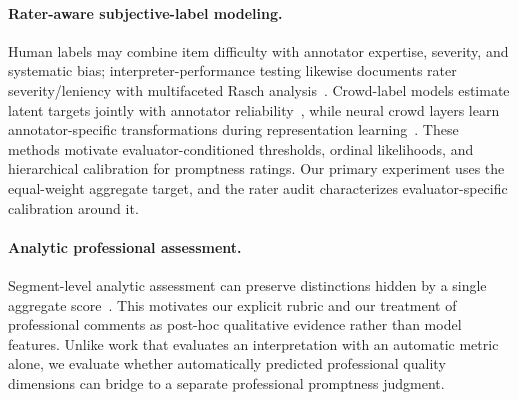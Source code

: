 \paragraph{Rater-aware subjective-label modeling.}
Human labels may combine item difficulty with annotator expertise, severity, and systematic bias; interpreter-performance testing likewise documents rater severity/leniency with multifaceted Rasch analysis~\citep{han2015rater}. Crowd-label models estimate latent targets jointly with annotator reliability~\citep{whitehill2009whose,raykar2010learning}, while neural crowd layers learn annotator-specific transformations during representation learning~\citep{rodrigues2018deep}. These methods motivate evaluator-conditioned thresholds, ordinal likelihoods, and hierarchical calibration for promptness ratings. Our primary experiment uses the equal-weight aggregate target, and the rater audit characterizes evaluator-specific calibration around it.

\paragraph{Analytic professional assessment.}
Segment-level analytic assessment can preserve distinctions hidden by a single aggregate score~\citep{han2021reimagined}. This motivates our explicit rubric and our treatment of professional comments as post-hoc qualitative evidence rather than model features. Unlike work that evaluates an interpretation with an automatic metric alone, we evaluate whether automatically predicted professional quality dimensions can bridge to a separate professional promptness judgment.

